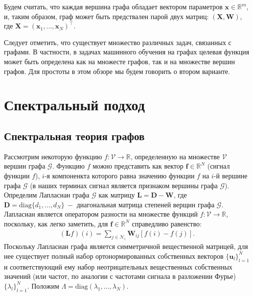 \documentclass[]{article}
\let\v\mathbf
\begin{document}
Будем считать, что каждая вершина графа обладает вектором параметров $\v{x}\in\mathbb{R}^m$, и, таким образом, граф может быть предствален парой двух матриц: $(\v{X}, \v{W})$, где $\v{X}=(\v{x}_1,\dots,\v{x}_N)^{\top}$.

Следует отметить, что существует множество различных задач, связанных с графами. В частности, в задачах машинного обучения на графах целевая функция может быть определена как на множесте графов, так и на множестве вершин графов. Для простоты в этом обзоре мы будем говорить о втором варианте.

\section{Спектральный подход}

\subsection*{Спектральная теория графов}
Рассмотрим некоторую функцию $f:\mathcal{V}\to\mathbb{R}$, определенную на множестве $\mathcal{V}$ вершин графа $\mathcal{G}$. Функцию $f$ можно представить как вектор $\v{f}\in\mathbb{R}^N$ (сигнал функции $f$), $i$-я компоненкта которого равна значению функции $f$ на $i$-й вершине графа $\mathcal{G}$ (в наших терминах сигнал является признаком вершины графа $\mathcal{G}$). Определим Лапласиан графа $\mathcal{G}$ как матрицу $\v{L}=\v{D}-\v{W}$, где $\v{D}=\text{diag}\{d_1,\dots,d_N\}\ -$ диагональная матрица степеней верщин графа $\mathcal{G}$. Лапласиан является оператором разности на множестве функций $f:\mathcal{V}\to\mathbb{R}$, поскольку, как легко заметить, для $\v{f}\in\mathbb{R}^N$ справедливо равенство:
\begin{align}\label{laplacian}
    (\v{L}f)(i)=\sum_{j\in\mathcal{N}_i}\v{W}_{ij}[f(i)-f(j)].
\end{align}
Поскольку Лапласиан графа является симметричной вещественной матрицей, для нее существует полный набор ортонормированных собственных векторов $\{\v{u}_l\}_{l=1}^{N}$ и соответствующий ему набор неотрицательных вещественных собственных значений (или частот, по аналогии с частотами сигнала в разложении Фурье) $\{\lambda_l\}_{l=1}^{N}$. Положим $\Lambda=\text{diag}(\lambda_1,\dots,\lambda_N)$.

\end{document}
